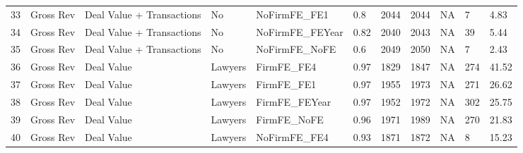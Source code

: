 \documentclass{article}
\begin{document}
\begin{table}[H]
\begin{tabular}{rllllllllll}
  33 & Gross Rev & Deal Value + Transactions & No & NoFirmFE\_FE1 & 0.8 & 2044 & 2044 & NA & 7 & 4.83 \\ 
  34 & Gross Rev & Deal Value + Transactions & No & NoFirmFE\_FEYear & 0.82 & 2040 & 2043 & NA & 39 & 5.44 \\ 
  35 & Gross Rev & Deal Value + Transactions & No & NoFirmFE\_NoFE & 0.6 & 2049 & 2050 & NA & 7 & 2.43 \\ 
  36 & Gross Rev & Deal Value & Lawyers & FirmFE\_FE4 & 0.97 & 1829 & 1847 & NA & 274 & 41.52 \\ 
  37 & Gross Rev & Deal Value & Lawyers & FirmFE\_FE1 & 0.97 & 1955 & 1973 & NA & 271 & 26.62 \\ 
  38 & Gross Rev & Deal Value & Lawyers & FirmFE\_FEYear & 0.97 & 1952 & 1972 & NA & 302 & 25.75 \\ 
  39 & Gross Rev & Deal Value & Lawyers & FirmFE\_NoFE & 0.96 & 1971 & 1989 & NA & 270 & 21.83 \\ 
  40 & Gross Rev & Deal Value & Lawyers & NoFirmFE\_FE4 & 0.93 & 1871 & 1872 & NA & 8 & 15.23 \\ 
   \hline
\end{tabular}
\end{table}
\end{document}
